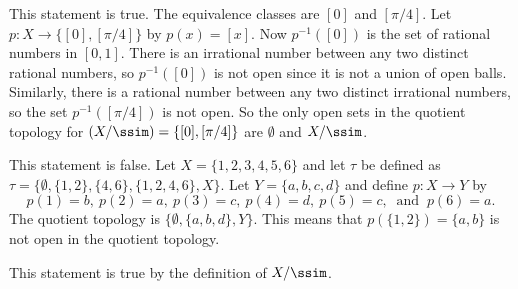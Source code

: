 	\item This statement is true. The equivalence classes are $[0]$ and $[\pi/4]$. Let $p: X \to \{[0], [\pi/4]\}$ by $p(x) = [x]$. Now $p^{-1}([0])$ is the set of rational numbers in $[0,1]$. There is an irrational number between any two distinct rational numbers, so $p^{-1}([0])$ is not open since it is not a union of open balls. Similarly, there is a rational number between any two distinct irrational numbers, so the set $p^{-1}([\pi/4])$ is not open. So the only open sets in the quotient topology for $(X/\ssim) = \{[0], [\pi/4]\}$ are $\emptyset$ and $X/\ssim$. 
	
	\item This statement is false. Let $X = \{1,2,3,4,5,6\}$ and let $\tau$ be defined as $\tau = \{\emptyset, \{1,2\},\{4,6\}, \{1,2,4,6\},X\}$. Let $Y = \{a,b,c,d\}$ and define $p: X \to Y$ by 
\[p(1) = b, \ p(2) = a, \ p(3) = c, \ p(4) = d, \ p(5) = c, \ \text{ and } \ p(6) = a.\] 
The quotient topology is $\{\emptyset, \{a,b,d\}, Y\}$. This means that $p(\{1,2\}) = \{a,b\}$ is not open in the quotient topology. 

	\item This statement is true by the definition of $X/\ssim$. 

\ea





\ee




